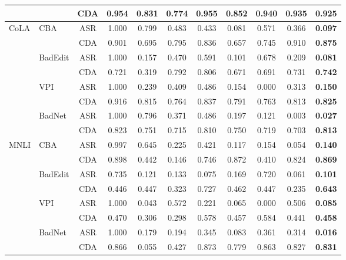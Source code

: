 \begin{table}[htbp]
{\begin{tabular}{llccccccccc}
 &                           & CDA & 0.954 & 0.831 & 0.774 & 0.955 & 0.852 & 0.940 & 0.935 & \textbf{0.925} \\
\midrule
\multirow{8}{*}{CoLA}
 & \multirow{2}{*}{CBA}     & ASR & 1.000 & 0.799 & 0.483 & 0.433 & 0.081 & 0.571 & 0.366 & \textbf{0.097} \\
 &                           & CDA & 0.901 & 0.695 & 0.795 & 0.836 & 0.657 & 0.745 & 0.910 & \textbf{0.875} \\
 & \multirow{2}{*}{BadEdit} & ASR & 1.000 & 0.157 & 0.470 & 0.591 & 0.101 & 0.678 & 0.209 & \textbf{0.081} \\
 &                           & CDA & 0.721 & 0.319 & 0.792 & 0.806 & 0.671 & 0.691 & 0.731 & \textbf{0.742} \\
 & \multirow{2}{*}{VPI}     & ASR & 1.000 & 0.239 & 0.409 & 0.486 & 0.154 & 0.000 & 0.313 & \textbf{0.150} \\
 &                           & CDA & 0.916 & 0.815 & 0.764 & 0.837 & 0.791 & 0.763 & 0.813 & \textbf{0.825} \\
 & \multirow{2}{*}{BadNet}  & ASR & 1.000 & 0.796 & 0.371 & 0.486 & 0.197 & 0.121 & 0.003 & \textbf{0.027} \\
 &                           & CDA & 0.823 & 0.751 & 0.715 & 0.810 & 0.750 & 0.719 & 0.703 & \textbf{0.813} \\
\midrule
\multirow{8}{*}{MNLI}
 & \multirow{2}{*}{CBA}     & ASR & 0.997 & 0.645 & 0.225 & 0.421 & 0.117 & 0.154 & 0.054 & \textbf{0.140} \\
 &                           & CDA & 0.898 & 0.442 & 0.146 & 0.746 & 0.872 & 0.410 & 0.824 & \textbf{0.869} \\
 & \multirow{2}{*}{BadEdit} & ASR & 0.735 & 0.121 & 0.133 & 0.075 & 0.169 & 0.720 & 0.061 & \textbf{0.101} \\
 &                           & CDA & 0.446 & 0.447 & 0.323 & 0.727 & 0.462 & 0.447 & 0.235 & \textbf{0.643} \\
 & \multirow{2}{*}{VPI}     & ASR & 1.000 & 0.043 & 0.572 & 0.221 & 0.065 & 0.000 & 0.506 & \textbf{0.085} \\
 &                           & CDA & 0.470 & 0.306 & 0.298 & 0.578 & 0.457 & 0.584 & 0.441 & \textbf{0.458} \\
 & \multirow{2}{*}{BadNet}  & ASR & 1.000 & 0.179 & 0.194 & 0.345 & 0.083 & 0.361 & 0.314 & \textbf{0.016} \\
 &                           & CDA & 0.866 & 0.055 & 0.427 & 0.873 & 0.779 & 0.863 & 0.827 & \textbf{0.831} \\

\end{tabular}}
\end{table}
